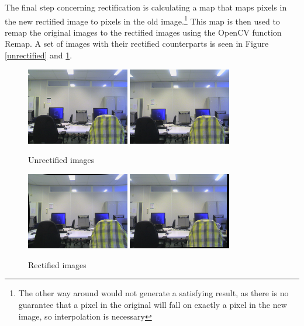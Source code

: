 \documentclass[a4paper]{article}
\begin{document}
The final step concerning rectification is calculating a map that maps
pixels in the new rectified image to pixels in the old
image.\footnote{The other way around would not generate a satisfying
result, as there is no guarantee that a pixel in the original will
fall on exactly a pixel in the new image, so interpolation is
necessary} This map is then used to remap the original images to the
rectified images using the OpenCV function Remap. A set of images with
their rectified counterparts is seen in Figure \ref{unrectified} and
\ref{rectified}.

\begin{figure}[h] \centering
  \includegraphics[width=0.4\textwidth]{leftown}
  \includegraphics[width=0.4\textwidth]{rightown}
  \caption{Unrectified images}
  \label{unrectified}

  \includegraphics[width=0.4\textwidth]{leftownr}
  \includegraphics[width=0.4\textwidth]{rightownr}
  \caption{Rectified images}
  \label{rectified}
\end{figure} \newpage
\end{document}
